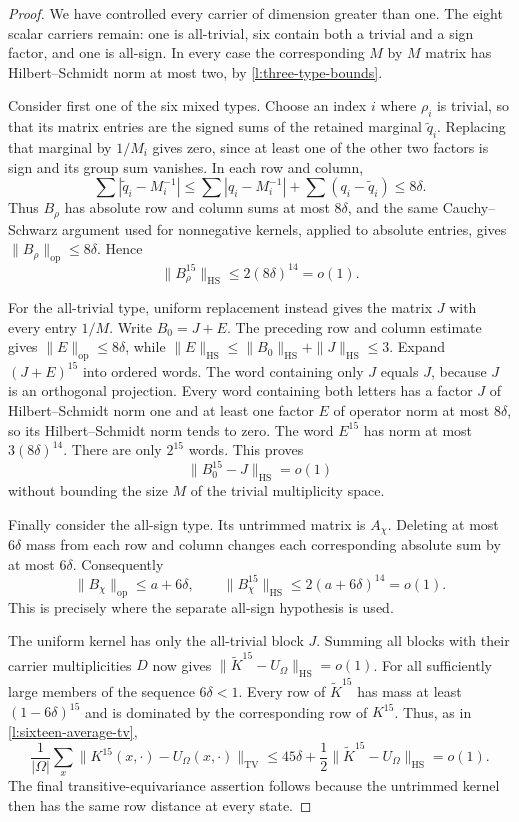 \begin{proof}
We have controlled every carrier of dimension greater than one.
The eight scalar carriers remain: one is all-trivial, six contain
both a trivial and a sign factor, and one is all-sign.  In every
case the corresponding $M$ by $M$ matrix has Hilbert--Schmidt norm
at most two, by \eqref{l:three-type-bounds}.

Consider first one of the six mixed types.  Choose an index $i$
where $\rho_i$ is trivial, so that its matrix entries are the signed
sums of the retained marginal $\widetilde q_i$.  Replacing that
marginal by $1/M_i$ gives zero, since at least one of the other two
factors is sign and its group sum vanishes.  In each row and column,
\[
 \sum|\widetilde q_i-M_i^{-1}|
 \le\sum|q_i-M_i^{-1}|+\sum(q_i-\widetilde q_i)
 \le8\delta.
\]
Thus $B_\rho$ has absolute row and column sums at most $8\delta$,
and the same Cauchy--Schwarz argument used for nonnegative kernels,
applied to absolute entries, gives
$\|B_\rho\|_{\mathrm{op}}\le8\delta$.  Hence
\[
 \|B_\rho^{15}\|_{\mathrm{HS}}
       \le2(8\delta)^{14}=o(1).
\]

For the all-trivial type, uniform replacement instead gives the
matrix $J$ with every entry $1/M$.  Write $B_0=J+E$.
The preceding row and column estimate gives
$\|E\|_{\mathrm{op}}\le8\delta$, while
$\|E\|_{\mathrm{HS}}\le\|B_0\|_{\mathrm{HS}}+\|J\|_{\mathrm{HS}}
\le3$.  Expand $(J+E)^{15}$ into ordered words.  The word containing
only $J$ equals $J$, because $J$ is an orthogonal projection.  Every
word containing both letters has a factor $J$ of Hilbert--Schmidt
norm one and at least one factor $E$ of operator norm at most
$8\delta$, so its Hilbert--Schmidt norm tends to zero.  The word
$E^{15}$ has norm at most $3(8\delta)^{14}$.  There are only $2^{15}$
words.  This proves
\[
 \|B_0^{15}-J\|_{\mathrm{HS}}=o(1)
\]
without bounding the size $M$ of the trivial multiplicity space.

Finally consider the all-sign type.  Its untrimmed matrix is
$A_\chi$.  Deleting at most $6\delta$ mass from each row and column
changes each corresponding absolute sum by at most $6\delta$.
Consequently
\[
 \|B_\chi\|_{\mathrm{op}}\le a+6\delta,
 \qquad
 \|B_\chi^{15}\|_{\mathrm{HS}}
       \le2(a+6\delta)^{14}=o(1).
\]
This is precisely where the separate all-sign hypothesis is used.

The uniform kernel has only the all-trivial block $J$.  Summing all
blocks with their carrier multiplicities $D$ now gives
$\|\widetilde K^{15}-U_\Omega\|_{\mathrm{HS}}=o(1)$.
For all sufficiently large members of the sequence $6\delta<1$.
Every row of $\widetilde K^{15}$ has mass at least
$(1-6\delta)^{15}$ and is dominated by the corresponding row of
$K^{15}$.  Thus, as in \eqref{l:sixteen-average-tv},
\[
 \frac1{|\Omega|}\sum_x
       \|K^{15}(x,\cdot)-U_\Omega(x,\cdot)\|_{\mathrm{TV}}
 \le45\delta+\frac12\|\widetilde K^{15}-U_\Omega\|_{\mathrm{HS}}
 =o(1).
\]
The final transitive-equivariance assertion follows because the
untrimmed kernel then has the same row distance at every state.
\end{proof}

